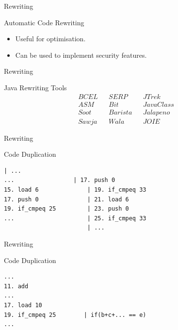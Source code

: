 

\begin{frame}{Rewriting}{}
\begin{block}{Automatic Code Rewriting}
	\begin{itemize}
		\item Useful for optimisation.
		\item Can be used to implement security features.
	\end{itemize}	
\end{block}
\end{frame}

\begin{frame}{Rewriting}{}
\begin{block}{Java Rewriting Tools}
\begin{align*}
BCEL && SERP && JTrek \\
ASM && Bit && JavaClass \\
Soot && Barista && Jalapeno \\
Sawja && Wala && JOIE
\end{align*}
\end{block}
\end{frame}

\begin{frame}[fragile]{Rewriting}{}
\begin{block}{Code Duplication}
\begin{lstlisting}[numbers=none, moredelim={[is][keywordstyle]{@@}{@@}}]                  
                        | ...
...	                | 17. push 0
15. load 6              | 19. if_cmpeq 33
17. push 0              | 21. load 6
19. if_cmpeq 25         | 23. push 0
...                     | 25. if_cmpeq 33
                        | ...
\end{lstlisting}  
\end{block}  
\end{frame}

\begin{frame}[fragile]{Rewriting}{}
\begin{block}{Code Duplication}
\begin{lstlisting}[numbers=none, moredelim={[is][keywordstyle]{@@}{@@}}]                  
...
11. add             
...	                          
17. load 10             
19. if_cmpeq 25        | if(b+c+... == e)
...                     
                     
\end{lstlisting}
\end{block}  
\end{frame}

